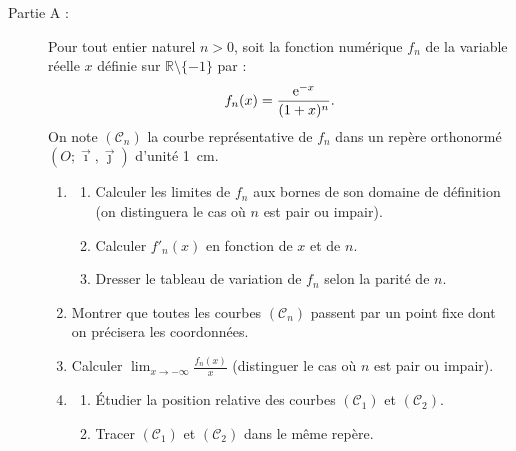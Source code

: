 \begin{exo} 
      \begin{description}
      \item[Partie A :]
            Pour tout entier naturel $n>0$, soit la fonction num\'erique $f_n$ de la variable r\'eelle $x$
            d\'efinie sur $\mathbb{R} \setminus \{ -1 \}$ par :
            \[
                  f_n(x) = \frac{\mathrm{e}^{-x}}{(1+x)^n}.
            \]
            On note $(\mathscr{C}_n)$ la courbe repr\'esentative de $f_n$ dans un rep\`ere orthonorm\'e
            $(O ; \vec{\imath} , \vec{\jmath} )$ d'unit\'e 1~cm.
            \begin{enumerate}
                  \item \begin{enumerate}
                              \item Calculer les limites de $f_n$ aux bornes de son domaine de d\'efinition
                                    (on distinguera le cas o\`u $n$ est pair ou impair).
                              \item Calculer $f'_n (x)$ en fonction de $x$ et de $n$.
                              \item Dresser le tableau de variation de $f_n$ selon la parit\'e de $n$.
                        \end{enumerate}
                  \item Montrer que toutes les courbes $(\mathscr{C}_n)$ passent par un point 
                        fixe dont on pr\'ecisera les coordonn\'ees.
                  \item Calculer $\displaystyle{\lim_{x\rightarrow-\infty} \frac{f_n(x)}{x}}$
                        (distinguer le cas o\`u $n$ est pair ou impair).
                  \item \begin{enumerate}
                              \item \'Etudier la position relative des courbes $(\mathscr{C}_1)$ et $(\mathscr{C}_2)$.
                              \item Tracer $(\mathscr{C}_1)$ et $(\mathscr{C}_2)$ dans le m\^eme rep\`ere.
                        \end{enumerate}
            \end{enumerate}


\end{description}
\end{exo}
